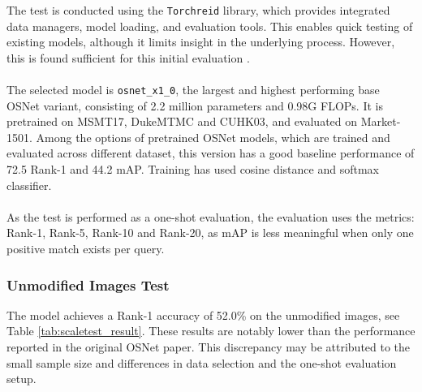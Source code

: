 \noindent The test is conducted using the \texttt{Torchreid} library, which provides integrated data managers, model loading, and evaluation tools. This enables quick testing of existing models, although it limits insight in the underlying process. However, this is found sufficient for this initial evaluation \cite{TorchReIDM1501}. 
\\\\
The selected model is \texttt{osnet\_x1\_0}, the largest and highest performing base \acs{OSNet} variant, consisting of 2.2 million parameters and 0.98G FLOPs. It is pretrained on \acf{MSMT17}, \acf{DukeMTMC} and \acf{CUHK03}, and evaluated on Market-1501. Among the options of pretrained \acs{OSNet} models, which are trained and evaluated across different dataset, this version has a good baseline performance of 72.5 Rank-1 and 44.2 \acs{mAP}. Training has used cosine distance and softmax classifier.
\\\\
As the test is performed as a one-shot evaluation, the evaluation uses the metrics: Rank-1, Rank-5, Rank-10 and Rank-20, as \acs{mAP} is less meaningful when only one positive match exists per query. 

\subsubsection{Unmodified Images Test}
The model achieves a Rank-1 accuracy of 52.0\% on the unmodified images, see Table \ref{tab:scaletest_result}. These results are notably lower than the performance reported in the original \acs{OSNet} paper. This discrepancy may be attributed to the small sample size and differences in data selection and the one-shot evaluation setup.


